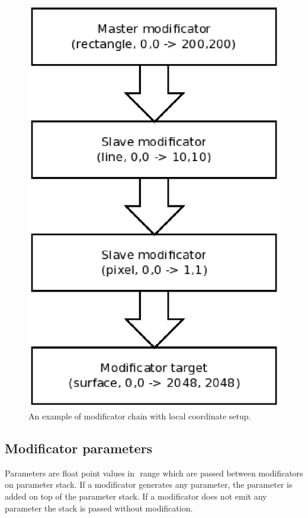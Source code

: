 \documentclass[9pt]{article}
\begin{document}
\begin{figure}[h]
\begin{center}
  \includegraphics[scale=0.6]{p05.eps}
  \caption{An example of modificator chain with local coordinate setup.}
\end{center}
\end{figure}

\subsection{Modificator parameters}

Parameters are float point values in \begin{math}<0,1>\end{math} range which are passed between
modificators on parameter stack. If a modificator generates any parameter, the
parameter is added on top of the parameter stack. If a modificator does not
emit any parameter the stack is passed without modification.
\end{document}
